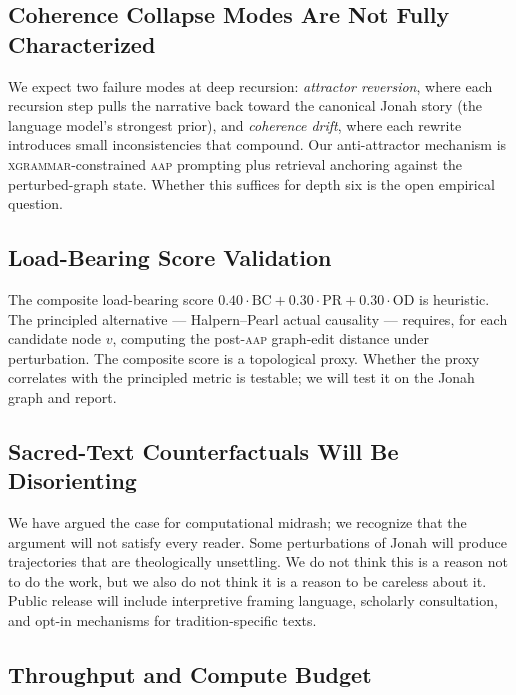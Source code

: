 \documentclass[11pt]{article}
\theoremstyle{rukha}
\begin{document}
\subsection{Coherence Collapse Modes Are Not Fully Characterized}

We expect two failure modes at deep recursion: \emph{attractor
reversion}, where each recursion step pulls the narrative back toward
the canonical Jonah story (the language model's strongest prior), and
\emph{coherence drift}, where each rewrite introduces small
inconsistencies that compound. Our anti-attractor mechanism is
\textsc{xgrammar}-constrained \textsc{aap} prompting plus retrieval
anchoring against the perturbed-graph state. Whether this suffices for
depth six is the open empirical question.

\subsection{Load-Bearing Score Validation}

The composite load-bearing score $0.40 \cdot \text{BC} + 0.30 \cdot
\text{PR} + 0.30 \cdot \text{OD}$ is heuristic. The principled
alternative --- Halpern–Pearl actual causality \cite{halpernpearlcausality}
--- requires, for each candidate node $v$, computing the post-\textsc{aap}
graph-edit distance under perturbation. The composite score is a
topological proxy. Whether the proxy correlates with the principled
metric is testable; we will test it on the Jonah graph and report.

\subsection{Sacred-Text Counterfactuals Will Be Disorienting}

We have argued the case for computational midrash; we recognize that
the argument will not satisfy every reader. Some perturbations of Jonah
will produce trajectories that are theologically unsettling. We do not
think this is a reason not to do the work, but we also do not think it
is a reason to be careless about it. Public release will include
interpretive framing language, scholarly consultation, and opt-in
mechanisms for tradition-specific texts.

\subsection{Throughput and Compute Budget}
\end{document}
